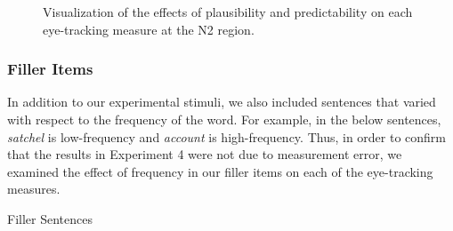\documentclass[
  12pt,
  letterpaper,
]{scrreprt}
\begin{document}
\begin{figure}[htbp]

\caption{\label{fig-fullmodelresultsn2}Visualization of the effects of
plausibility and predictability on each eye-tracking measure at the N2
region.}


\end{figure}%

\subsubsection{Filler Items}\label{filler-items}

In addition to our experimental stimuli, we also included sentences that
varied with respect to the frequency of the word. For example, in the
below sentences, \emph{satchel} is low-frequency and \emph{account} is
high-frequency. Thus, in order to confirm that the results in Experiment
4 were not due to measurement error, we examined the effect of frequency
in our filler items on each of the eye-tracking measures.

\begin{exe}
\ex Filler Sentences \label{fillers}
\begin{xlist}
\end{xlist}
\end{exe}
\end{document}
